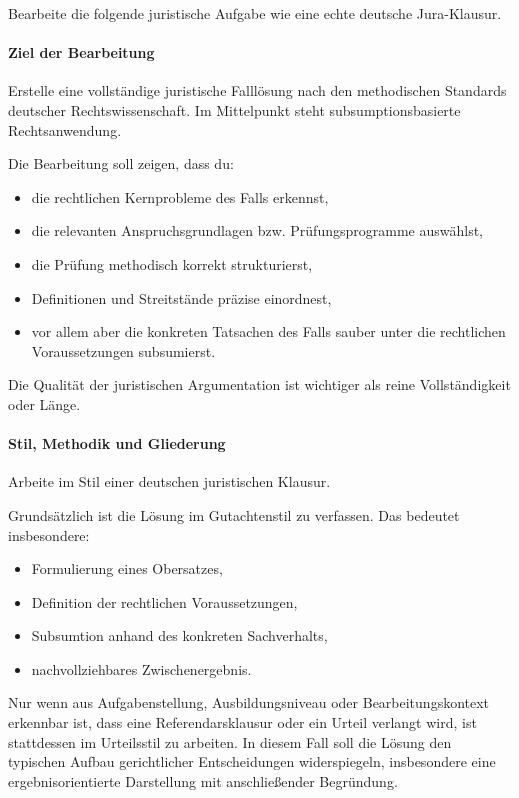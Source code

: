 \documentclass[11pt]{article}
\providecommand{\tightlist}{%
  \setlength{\itemsep}{0pt}\setlength{\parskip}{0pt}}
\begin{document}
Bearbeite die folgende juristische Aufgabe wie eine echte deutsche
Jura-Klausur.

\paragraph{\texorpdfstring{\textbf{Ziel der
Bearbeitung}}{Ziel der Bearbeitung}}\label{ziel-der-bearbeitung}

Erstelle eine vollständige juristische Falllösung nach den methodischen
Standards deutscher Rechtswissenschaft. Im Mittelpunkt steht
subsumptionsbasierte Rechtsanwendung.

Die Bearbeitung soll zeigen, dass du:

\begin{itemize}
\tightlist
\item
  die rechtlichen Kernprobleme des Falls erkennst,
\item
  die relevanten Anspruchsgrundlagen bzw. Prüfungsprogramme auswählst,
\item
  die Prüfung methodisch korrekt strukturierst,
\item
  Definitionen und Streitstände präzise einordnest,
\item
  vor allem aber die konkreten Tatsachen des Falls sauber unter die
  rechtlichen Voraussetzungen subsumierst.
\end{itemize}

Die Qualität der juristischen Argumentation ist wichtiger als reine
Vollständigkeit oder Länge.

\paragraph{Stil, Methodik und
Gliederung}\label{stil-methodik-und-gliederung}

Arbeite im Stil einer deutschen juristischen Klausur.

Grundsätzlich ist die Lösung im Gutachtenstil zu verfassen. Das bedeutet
insbesondere:

\begin{itemize}
\tightlist
\item
  Formulierung eines Obersatzes,
\item
  Definition der rechtlichen Voraussetzungen,
\item
  Subsumtion anhand des konkreten Sachverhalts,
\item
  nachvollziehbares Zwischenergebnis.
\end{itemize}

Nur wenn aus Aufgabenstellung, Ausbildungsniveau oder
Bearbeitungskontext erkennbar ist, dass eine Referendarsklausur oder ein
Urteil verlangt wird, ist stattdessen im Urteilsstil zu arbeiten. In
diesem Fall soll die Lösung den typischen Aufbau gerichtlicher
Entscheidungen widerspiegeln, insbesondere eine ergebnisorientierte
Darstellung mit anschließender Begründung.
\end{document}
